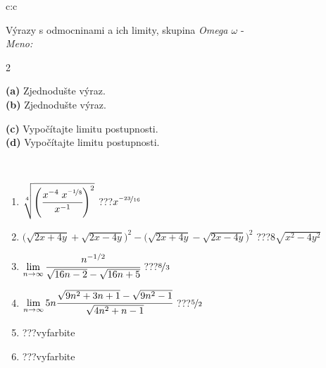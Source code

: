 \documentclass[10pt]{report}
\begin{document}
\begin{tabular}{c:c}
\begin{minipage}[c][104.5mm][t]{0.5\linewidth}
\begin{center}
\vspace{7mm}
{\huge {\Large Výrazy s odmocninami a ich limity}, skupina \textit{Omega $\omega$} -}\\[5mm]
\textit{Meno:}\phantom{xxxxxxxxxxxxxxxxxxxxxxxxxxxxxxxxxxxxxxxxxxxxxxxxxxxxxxxxxxxxxxxxx}\\[5mm]
\begin{minipage}{0.95\linewidth}
\begin{center}
{\small \begin{multicols}{2} \raggedright
\phantom{xxxxxxxxx}\textbf{(a)} Zjednodušte výraz. \\[1mm]
\phantom{xxxxxxxxx}\textbf{(b)} Zjednodušte výraz. \par \columnbreak
\textbf{(c)} Vypočítajte limitu postupnosti. \\[1mm]
\textbf{(d)} Vypočítajte limitu postupnosti.
\end{multicols}
}
\end{center}
\end{minipage}
\\[4mm]
\begin{minipage}{0.79\linewidth}
\begin{center}
\begin{varwidth}{\linewidth}
\begin{enumerate}
\small
\item $\sqrt[4]{\left(\cfrac{x^{-4}\;x^{\nicefrac{-1}{8}}}{x^{-1}}\right)^{2}}$\quad \dotfill\; ???\;\dotfill \quad $x^{\nicefrac{-23}{16}}$
\item {\footnotesize{\scriptsize$\big(\sqrt{2x+4y}+\sqrt{2x-4y}\big)^2-\big(\sqrt{2x+4y}-\sqrt{2x-4y}\big)^2$}\quad \dotfill\; ???\;\dotfill \quad $8\sqrt{x^2-4y^2}$}
\item $\lim\limits_{n\to\infty}\cfrac{n^{-1/2}}{\sqrt{16n-2}-\sqrt{16n+5}}$\quad \dotfill\; ???\;\dotfill \quad $\nicefrac{8}{3}$
\item $\lim\limits_{n\to\infty}5n\cfrac{\sqrt{9n^2+3n+1}-\sqrt{9n^2-1}}{\sqrt{4n^2+n-1}}$\quad \dotfill\; ???\;\dotfill \quad $\nicefrac{5}{2}$
\item \quad \dotfill\; ???\;\dotfill \quad vyfarbite
\item \quad \dotfill\; ???\;\dotfill \quad vyfarbite
\end{enumerate}
\end{varwidth}

\end{center}
\end{minipage}
\end{center}
\end{minipage}
\end{tabular}
\end{document}

